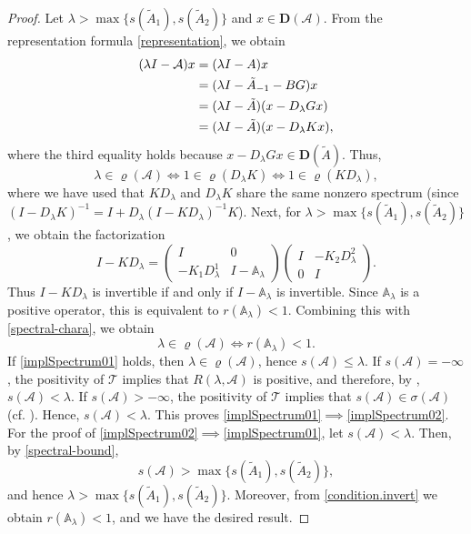 \documentclass[a4paper,11pt,reqno]{amsart}
\def\A{{\mathbb{A}}}
\def\la{\lambda}
\def\calA{{\mathcal{A}}}
\theoremstyle{plain}
\numberwithin{equation}{section}
\begin{document}
\begin{proof}
Let $\la >\max\{s(\tilde{A}_1),s(\tilde{A}_2)\}$ and $x\in {\bm D}(\calA) $. From the representation formula \eqref{representation}, we obtain
\begin{align}
(\la I-\calA )x &=(\la I- A)x\notag\\
&=(\la I- \tilde{A}_{-1}-B G)x\notag\\
&=(\la I- \tilde{A})(x-D_\la Gx)\notag\\
&=(\la I- \tilde{A})(x-D_\la Kx), \label{resolvent.charact}
\end{align}
where the third equality holds because $x-D_\la Gx\in {\bm D}(\tilde{A})$. Thus,
\begin{equation}\label{spectral-chara}
\la \in \varrho(\calA) \iff 1\in \varrho( D_\la K) \iff 1\in \varrho(K D_\la ),
\end{equation}
where we have used that $K D_\lambda$ and $D_\lambda K$ share the same nonzero spectrum (since $(I - D_\lambda K)^{-1}=I+D_\lambda (I - K D_\lambda)^{-1} K$). Next, for $\la >\max\{s(\tilde{A}_1),s(\tilde{A}_2)\}$, we obtain the factorization
\begin{equation}\label{cara2}
I-K D_\la=\left( \begin{matrix}
I & 0\\
-K_1 D_\la^1 & I-\A_\la
\end{matrix}\right)\left(\begin{matrix}
I & -K_2 D_\la^2\\
0& I
\end{matrix}\right).
\end{equation}
Thus $I-KD_\lambda$ is invertible if and only if $I-\A_\lambda$ is invertible. Since $\A_\lambda$ is a positive operator, this is equivalent to $r(\A_\lambda)<1$. 
Combining this with \eqref{spectral-chara}, we obtain
\begin{equation}\label{condition.invert}
\lambda\in \varrho(\mathcal{A}) \iff r(\A_\lambda)<1.
\end{equation}
If \ref{implSpectrum01} holds, then $\lambda\in \varrho(\mathcal{A})$, hence $s(\mathcal{A})\le \lambda$. If $s(\mathcal{A})=-\infty$, the positivity of $\mathcal{T}$ implies that $R(\lambda,\mathcal{A})$ is positive, and therefore, by \cite[Theorem C-III.1.1-(b)]{MR839450}, $s(\mathcal{A})<\lambda$. If $s(\mathcal{A})>-\infty$, the positivity of $\mathcal{T}$ implies that $s(\mathcal{A})\in \sigma(\mathcal{A})$ (cf. \cite[Theorem C-III.1.1-(a)]{MR839450}). Hence, $s(\mathcal{A})<\lambda$. This proves \ref{implSpectrum01}$\implies$\ref{implSpectrum02}. For the proof of \ref{implSpectrum02}$\implies$\ref{implSpectrum01}, let $s(\calA)<\lambda$. Then, by \eqref{spectral-bound},
\begin{equation*}
s(\calA) > \max\{s(\tilde{A}_1),s(\tilde{A}_2)\},
\end{equation*}
and hence $\lambda>\max\{s(\tilde{A}_1),s(\tilde{A}_2)\}$. Moreover, from \eqref{condition.invert} we obtain $r(\A_\lambda)<1$, and we have the desired result.


\end{proof}
\end{document}

